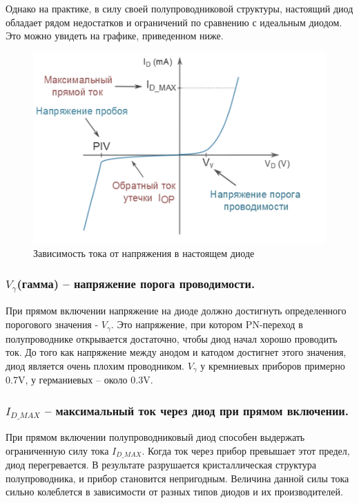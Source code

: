 \documentclass[a4paper,14pt]{article}
\begin{document}
Однако на практике, в силу своей полупроводниковой структуры, настоящий диод обладает рядом недостатков и ограничений по сравнению с идеальным диодом. 
Это можно увидеть на графике, приведенном ниже.

\begin{figure}[H]
	\centering
	\includegraphics{image/intro_002}
	\caption{Зависимость тока от напряжения в настоящем диоде}
	\label{fig:intro002}
\end{figure}

\subsubsection{$V_{\gamma}$(гамма) -- напряжение порога проводимости.}

При прямом включении напряжение на диоде должно достигнуть определенного порогового значения - $V_{\gamma}$. 
Это напряжение, при котором PN-переход в полупроводнике открывается достаточно, чтобы диод начал хорошо проводить ток. 
До того как напряжение между анодом и катодом достигнет этого значения, диод является очень плохим проводником. 
$V_{\gamma}$ у кремниевых приборов примерно 0.7V, у германиевых – около 0.3V.

\subsubsection{$I_{D\_MAX}$ -- максимальный ток через диод при прямом включении.}

При прямом включении полупроводниковый диод способен выдержать ограниченную силу тока $I_{D\_MAX}$. 
Когда ток через прибор превышает этот предел, диод перегревается. 
В результате разрушается кристаллическая структура полупроводника, и прибор становится непригодным. 
Величина данной силы тока сильно колеблется в зависимости от разных типов диодов и их производителей.
\end{document}
